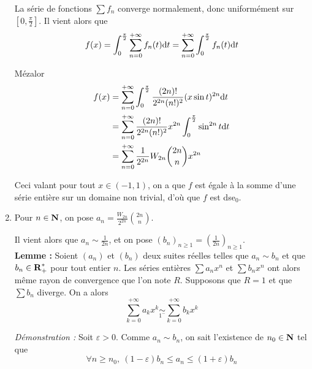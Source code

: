 \begin{correction}
\begin{enumerate}
		La série de fonctions $\displaystyle\sum f_n$ converge normalement, donc uniformément sur $\left[0,\frac\pi2\right]$. Il vient alors que 
		\[f(x)=\int_0^\frac\pi2\sum_{n=0}^{+\infty}f_n(t)\mathrm{d} t = \sum_{n=0}^{+\infty}\int_0^\frac\pi2 f_n(t)\mathrm{d} t \]

		Mézalor 
		\begin{align*}
			f(x) &= \sum_{n=0}^{+\infty}\int_0^\frac\pi2\frac{(2n)!}{2^{2n}(n!)^2}(x\sin t)^{2n}\mathrm{d} t\\
				 &= \sum_{n=0}^{+\infty}\frac{(2n)!}{2^{2n}(n!)^2}x^{2n}\int_0^\frac\pi2\sin^{2n} t\mathrm{d} t\\
				 &= \sum_{n=0}^{+\infty}\frac1{2^{2n}}W_{2n}\binom{2n}nx^{2n}
		\end{align*}

		Ceci valant pour tout $x\in(-1,1)$, on a que $f$ est égale à la somme d'une série entière sur un domaine non trivial, d'où que $f$ est dse${}_0$.

		\item Pour $n\in\operatorname{\mathbf{N}}$, on pose $a_n=\frac{W_{2n}}{2^{2n}}\binom{2n}n$.


		Il vient alors que $a_n\sim \frac1{2n}$, et on pose $(b_n)_{n\geq 1}=\left(\frac1{2n}\right)_{n\geq 1}$.\\


		\textbf{Lemme : } Soient $(a_n)$ et $(b_n)$ deux suites réelles telles que $a_n\sim b_n$ et que $b_n\in\operatorname{\mathbf{R}}_+^*$ pour tout entier $n$. Les séries entières $\displaystyle\sum a_nx^n$ et $\displaystyle\sum b_nx^n$ ont alors même rayon de convergence que l'on note $R$. Supposons que $R = 1$ et que $\displaystyle\sum b_n$ diverge. On a alors \[\sum_{k=0}^{+\infty}a_kx^k\underset{1^{-}}{\sim}\sum_{k=0}^{+\infty}b_kx^k\]


		\textit{Démonstration : } Soit $\varepsilon > 0$. Comme $a_n\sim b_n$, on sait l'existence de $n_0\in\operatorname{\mathbf{N}}$ tel que \[\forall n\geq n_0,\ (1-\varepsilon)b_n\leq a_n\leq (1+\varepsilon)b_n\]


\end{enumerate}
\end{correction}
